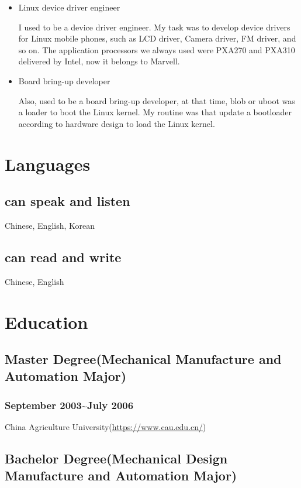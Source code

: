 \documentclass{article}
\begin{document}
\begin{itemize}
\item{Linux device driver engineer}

I used to be a device driver engineer. My task was to develop device drivers for Linux mobile phones, such as LCD driver, Camera driver, FM driver, and so on. The application processors we always used were PXA270 and PXA310 delivered by Intel, now it belongs to Marvell.

\item{Board bring-up developer}

Also, used to be a board bring-up developer, at that time, blob or uboot was a loader to boot the Linux kernel. My routine was that update a bootloader according to hardware design to load the Linux kernel.

\end{itemize}

\section{Languages}

\subsection{can speak and listen}
Chinese, English, Korean

\subsection{can read and write}
Chinese, English


\section{Education}

\subsection{Master Degree(Mechanical Manufacture and Automation Major)}
\subsubsection{September 2003\~{}July 2006}
China Agriculture University(\url{https://www.cau.edu.cn/})

\subsection{Bachelor Degree(Mechanical Design Manufacture and Automation Major)}
\end{document}
